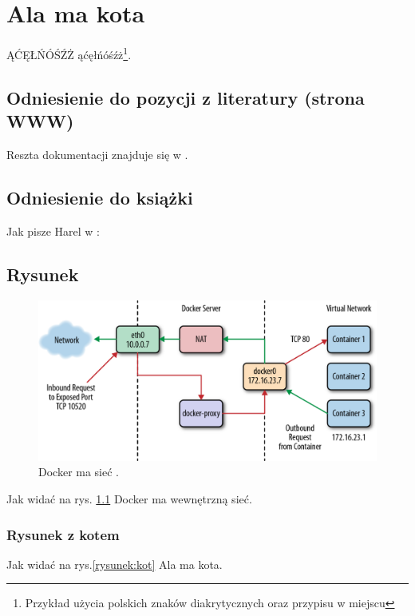 \chapter{Ala ma kota}

ĄĆĘŁŃÓŚŹŻ ąćęłńóśźż\footnote{Przykład użycia polskich znaków diakrytycznych oraz przypisu w miejscu}. \lipsum[1]

\section{Odniesienie do pozycji z literatury (strona WWW)}

Reszta dokumentacji znajduje się w \cite{docker_compose_reference}. \lipsum[3]

\section{Odniesienie do książki}

Jak pisze Harel w \cite{harel_rzecz_2008}: \lipsum[7]

\section{Rysunek}

\begin{figure}
    \centering\includegraphics[width=.6\textwidth]{img/swarm-network}
    \caption{Docker ma sieć \cite{docker_compose_reference}.}  \label{rys:network}
\end{figure}

Jak widać na rys. \ref{rys:network} Docker ma wewnętrzną sieć. \lipsum[1]


\subsection{Rysunek z kotem}

Jak widać na rys.\ref{rysunek:kot} Ala ma kota. \lipsum[9-10]

